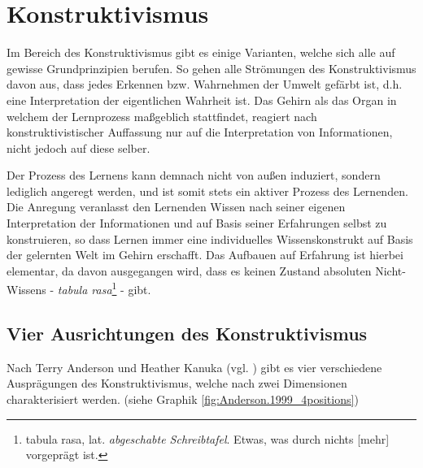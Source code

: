 \chapter{Konstruktivismus}
\label{cha:Konstruktivismus}
Im Bereich des Konstruktivismus gibt es einige Varianten, welche sich alle auf gewisse Grundprinzipien berufen. So gehen alle Strömungen des Konstruktivismus davon aus, dass jedes Erkennen bzw. Wahrnehmen der Umwelt gefärbt ist, d.h. eine Interpretation der eigentlichen Wahrheit ist. Das Gehirn als das Organ in welchem der Lernprozess maßgeblich stattfindet, reagiert nach konstruktivistischer Auffassung nur auf die Interpretation von Informationen, nicht jedoch auf diese selber. \cite{Reinmann.2013} %

Der Prozess des Lernens kann demnach nicht von außen induziert, sondern lediglich angeregt werden, und ist somit stets ein aktiver Prozess des Lernenden.  \cite{Reinmann.2013} %
Die Anregung veranlasst den Lernenden Wissen nach seiner eigenen Interpretation der Informationen und auf Basis seiner Erfahrungen selbst zu konstruieren, so dass Lernen immer eine individuelles Wissenskonstrukt auf Basis der gelernten Welt im Gehirn erschafft. \cite[S. 212]{Edelmann.2012} Das Aufbauen auf Erfahrung ist hierbei elementar, da davon ausgegangen wird, dass es keinen Zustand absoluten Nicht-Wissens - \emph{tabula rasa}\footnote{tabula rasa, lat. \emph{abgeschabte Schreibtafel}. \grqq Etwas, was durch nichts [mehr] vorgeprägt ist.\grqq \cite{Duden.2006}} - gibt. \cite{Anderson.1999} %

\section{Vier Ausrichtungen des Konstruktivismus}
\label{sec:Konstr_4positions}

Nach Terry Anderson und Heather Kanuka (vgl. \cite{Anderson.1999}) gibt es vier verschiedene Ausprägungen des Konstruktivismus, welche nach zwei Dimensionen charakterisiert werden. (siehe Graphik \ref{fig:Anderson.1999_4positions})

